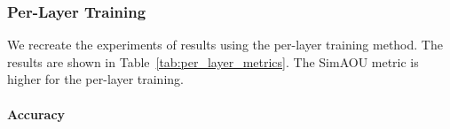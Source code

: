 \documentclass[11pt]{article}
\begin{document}
\subsubsection{Per-Layer Training}
We recreate the experiments of \cite{dai2023gpt} results using the per-layer training method.
The results are shown in Table~\ref{tab:per_layer_metrics}. The SimAOU metric is higher for the per-layer training.

\paragraph{Accuracy}



\end{document}
